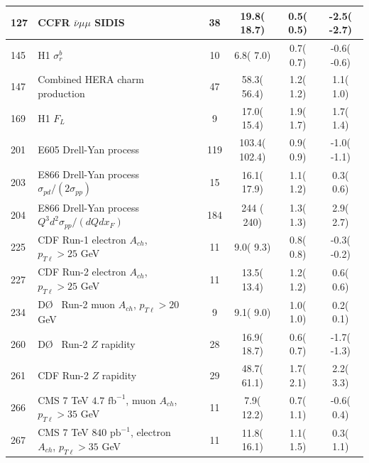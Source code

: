 \begin{widetext}
\begin{table}[htbp]
\begin{tabular}{|l|lr|c|c|c|c|}
 127 & CCFR  $\bar\nu \mu\mu$ SIDIS                                                        & \cite{Goncharov:2001qe}     &   38  &    19.8(  18.7) &   0.5( 0.5) &  -2.5( -2.7)   \tabularnewline\hline
 145 & H1 $\sigma_{r}^{b}$                                                                 & \cite{Aktas:2004az}         &   10  &     6.8(   7.0) &   0.7( 0.7) &  -0.6( -0.6)   \tabularnewline\hline
 147 & Combined HERA charm production                                                      & \cite{Abramowicz:1900rp}    &   47  &    58.3(  56.4) &   1.2( 1.2) &   1.1(  1.0)   \tabularnewline\hline
 169 & H1 $F_{L}$                                                                          & \cite{Collaboration:2010ry} &    9  &    17.0(  15.4) &   1.9( 1.7) &   1.7(  1.4)   \tabularnewline\hline
 201 & E605 Drell-Yan process                                                              & \cite{Moreno:1990sf}        &  119  &   103.4( 102.4) &   0.9( 0.9) &  -1.0( -1.1)   \tabularnewline\hline
 203 & E866 Drell-Yan process  $\sigma_{pd}/(2\sigma_{pp})$                                & \cite{Towell:2001nh}        &   15  &    16.1(  17.9) &   1.1( 1.2) &   0.3(  0.6)   \tabularnewline\hline
 204 & E866 Drell-Yan process  $Q^3 d^2\sigma_{pp}/(dQ dx_F)$                              & \cite{Webb:2003ps}          &  184  &   244 ( 240) &   1.3( 1.3) &   2.9(  2.7)   \tabularnewline\hline
 225 & CDF Run-1 electron  $A_{ch}$, $p_{T\ell}>25$ GeV                                    & \cite{Abe:1996us}           &   11  &     9.0(   9.3) &   0.8( 0.8) &  -0.3( -0.2)   \tabularnewline\hline
 227 & CDF Run-2 electron $A_{ch}$, $p_{T\ell}>25$ GeV                                     & \cite{Acosta:2005ud}        &   11  &    13.5(  13.4) &   1.2( 1.2) &   0.6(  0.6)   \tabularnewline\hline
 234 & D\O~ Run-2 muon $A_{ch}$, $p_{T\ell}>20$ GeV                                        & \cite{Abazov:2007pm}        &    9  &     9.1(   9.0) &   1.0( 1.0) &   0.2(  0.1)   \tabularnewline\hline
 260 & D\O~ Run-2 $Z$ rapidity                                                             & \cite{Abazov:2006gs}        &   28  &    16.9(  18.7) &   0.6( 0.7) &  -1.7( -1.3)   \tabularnewline\hline
 261 & CDF Run-2 $Z$ rapidity                                                              & \cite{Aaltonen:2010zza}     &   29  &    48.7(  61.1) &   1.7( 2.1) &   2.2(  3.3)   \tabularnewline\hline
 266 & CMS 7 TeV $4.7\mbox{ fb}^{-1}$, muon $A_{ch}$, $p_{T\ell}>35$ GeV                   & \cite{Chatrchyan:2013mza}   &   11  &     7.9(  12.2) &   0.7( 1.1) &  -0.6(  0.4)   \tabularnewline\hline
 267 & CMS 7 TeV $840\mbox{ pb}^{-1}$, electron $A_{ch}$, $p_{T\ell}>35$ GeV               & \cite{Chatrchyan:2012xt}    &   11  &    11.8(  16.1) &   1.1( 1.5) &   0.3(  1.1)   \tabularnewline\hline

\end{tabular}
\end{table}
\end{widetext}
